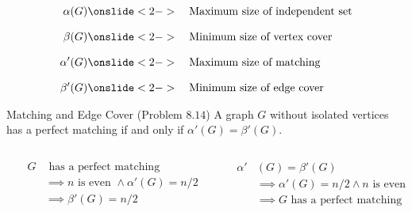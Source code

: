 \begin{frame}{}

  \begin{align*}
    \alpha(G) 	& \onslide<2->{\text{\quad Maximum size of independent set}} \\[8pt]
    \beta(G) 	& \onslide<2->{\text{\quad Minimum size of vertex cover}} \\[8pt]
    \alpha'(G)  & \onslide<2->{\text{\quad Maximum size of matching}} \\[8pt]
    \beta'(G) 	& \onslide<2->{\text{\quad Minimum size of edge cover}}
  \end{align*}

\end{frame}

\begin{frame}{}
  \begin{exampleblock}{Matching and Edge Cover (Problem $8.14$)}
    A graph $G$ without isolated vertices has a perfect matching if and only if $\alpha'(G) = \beta'(G)$.
  \end{exampleblock}

  \begin{columns}
      \pause
      \begin{center}
      \end{center}

      \pause
      \vspace{-0.30cm}
      \begin{align*}
	G &\text{ has a perfect matching} \\[5pt]
	&\implies n \text{ is even } \land \alpha'(G) = n/2 \\[5pt]
	&\implies \beta'(G) = n/2 %
      \end{align*}
      \pause
      \begin{center}
      \end{center}

      \pause
      \vspace{-0.30cm}
      \begin{align*}
	\alpha'&(G) = \beta'(G) \\[5pt]
	&\implies \alpha'(G) = n/2 \land n \text{ is even} \\[5pt]
	&\implies G \text{ has a perfect matching}
      \end{align*}
  \end{columns}
\end{frame}

